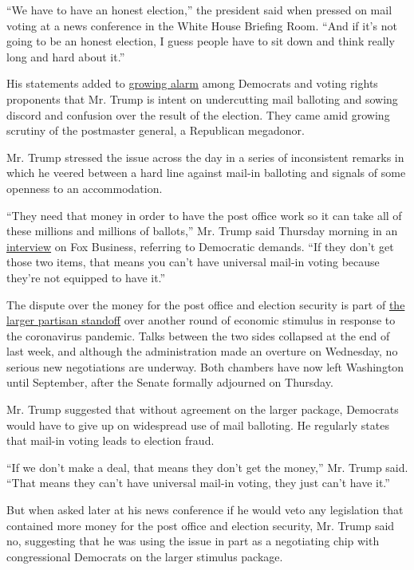 ``We have to have an honest election,'' the president said when pressed
on mail voting at a news conference in the White House Briefing Room.
``And if it's not going to be an honest election, I guess people have to
sit down and think really long and hard about it.''

His statements added to
\href{https://www.nytimes3xbfgragh.onion/2020/07/31/us/politics/trump-usps-mail-delays.html}{growing
alarm} among Democrats and voting rights proponents that Mr. Trump is
intent on undercutting mail balloting and sowing discord and confusion
over the result of the election. They came amid growing scrutiny of the
postmaster general, a Republican megadonor.

Mr. Trump stressed the issue across the day in a series of inconsistent
remarks in which he veered between a hard line against mail-in balloting
and signals of some openness to an accommodation.

``They need that money in order to have the post office work so it can
take all of these millions and millions of ballots,'' Mr. Trump said
Thursday morning in an
\href{https://www.foxbusiness.com/politics/trump-rips-dems-for-holding-up-coronavirus-stimulus-deal-with-demand-for-post-office-aid}{interview}
on Fox Business, referring to Democratic demands. ``If they don't get
those two items, that means you can't have universal mail-in voting
because they're not equipped to have it.''

The dispute over the money for the post office and election security is
part of
\href{https://www.nytimes3xbfgragh.onion/2020/08/12/us/politics/coronavirus-relief-bill.html}{the
larger partisan standoff} over another round of economic stimulus in
response to the coronavirus pandemic. Talks between the two sides
collapsed at the end of last week, and although the administration made
an overture on Wednesday, no serious new negotiations are underway. Both
chambers have now left Washington until September, after the Senate
formally adjourned on Thursday.

Mr. Trump suggested that without agreement on the larger package,
Democrats would have to give up on widespread use of mail balloting. He
regularly states that mail-in voting leads to election fraud.

``If we don't make a deal, that means they don't get the money,'' Mr.
Trump said. ``That means they can't have universal mail-in voting, they
just can't have it.''

But when asked later at his news conference if he would veto any
legislation that contained more money for the post office and election
security, Mr. Trump said no, suggesting that he was using the issue in
part as a negotiating chip with congressional Democrats on the larger
stimulus package.


